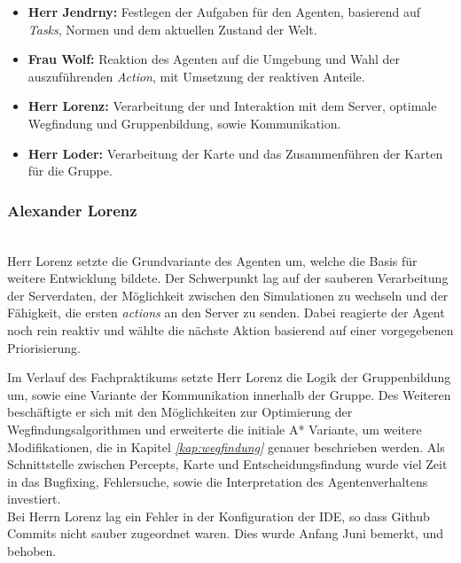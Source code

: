 \begin{itemize}
    \item \textbf{Herr Jendrny:} Festlegen der Aufgaben für den Agenten, basierend auf \textit{Tasks}, Normen und dem aktuellen Zustand der Welt.  
    \item \textbf{Frau Wolf:} Reaktion des Agenten auf die Umgebung und Wahl der auszuführenden \textit{Action}, mit Umsetzung der reaktiven Anteile.
    \item \textbf{Herr Lorenz:} Verarbeitung der \Percepts und Interaktion mit dem Server, optimale Wegfindung und Gruppenbildung, sowie Kommunikation.
    \item \textbf{Herr Loder:} Verarbeitung der Karte und das Zusammenführen der Karten für die Gruppe.
\end{itemize}


\subsubsection{Alexander Lorenz} ~\\
Herr Lorenz setzte die Grundvariante des Agenten um, welche die Basis für weitere Entwicklung bildete. Der Schwerpunkt lag auf der sauberen Verarbeitung der Serverdaten, der Möglichkeit zwischen den Simulationen zu wechseln und der Fähigkeit, die ersten \textit{actions} an den Server zu senden. Dabei reagierte der Agent noch rein reaktiv und wählte die nächste Aktion basierend auf einer vorgegebenen Priorisierung. \newline

Im Verlauf des Fachpraktikums setzte Herr Lorenz die Logik der Gruppenbildung um, sowie eine Variante der Kommunikation innerhalb der Gruppe. Des Weiteren beschäftigte er sich mit den Möglichkeiten zur Optimierung der Wegfindungsalgorithmen und erweiterte die initiale A* Variante, um weitere Modifikationen, die in Kapitel \textit{\ref{kap:wegfindung}} genauer beschrieben werden. Als Schnittstelle zwischen Percepts, Karte und Entscheidungsfindung wurde viel Zeit in das Bugfixing, Fehlersuche, sowie die Interpretation des Agentenverhaltens investiert. \\

Bei Herrn Lorenz lag ein Fehler in der Konfiguration der IDE, so dass Github Commits nicht sauber zugeordnet waren. Dies wurde Anfang Juni bemerkt, und behoben.  

